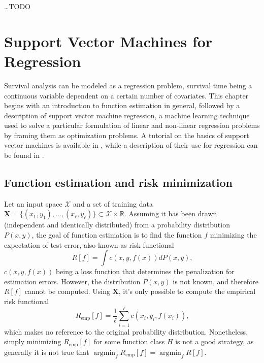 \documentclass[12pt]{report}
\begin{document}
\ldots TODO


\chapter{Support Vector Machines for Regression}
\label{chsvm}
Survival analysis can be modeled as a regression problem, survival time being a continuous variable dependent on a certain number of covariates. This chapter begins with an introduction to function estimation in general, followed by a description of support vector machine regression, a machine learning technique used to solve a particular formulation of linear and non-linear regression problems by framing them as optimization problems. A tutorial on the basics of support vector machines is available in \cite{svmtutorial}, while a description of their use for regression can be found in \cite{svregtutorial}.

\section{Function estimation and risk minimization}
Let an input space $ \mathcal{X} $ and a set of training data $ \mathbf{X} = \lbrace (x_{1},y_{1}),\ldots,(x_{\ell},y_{\ell})\rbrace \subset \mathcal{X} \times \mathbb{R} $. Assuming it has been drawn (independent and identically distributed) from a probability distribution $ P(x,y) $, the goal of function estimation is to find the function $ f $ minimizing the expectation of test error, also known as risk functional \cite{vapnik82}
\begin{equation} \label{riskfun}
R[f] = \int c(x,y,f(x))dP(x,y) \text{,}
\end{equation}
$ c(x,y,f(x)) $ being a loss function that determines the penalization for estimation errors. However, the distribution $ P(x,y) $ is not known, and therefore $ R[f] $ cannot be computed. Using $ \mathbf{X} $, it's only possible to compute the empirical risk functional
\begin{equation} \label{empriskfun}
R_{\text{emp}}[f] = \dfrac{1}{\ell} \sum_{i=1}^{\ell}c(x_{i},y_{i},f(x_{i})) \text{,}
\end{equation}
which makes no reference to the original probability distribution. Nonetheless, simply minimizing $ R_{\text{emp}}[f] $ for some function class $ H $ is not a good strategy, as generally it is not true that $ \operatorname*{argmin}_{f} R_{\text{emp}}[f] = \operatorname*{argmin}_{f} R[f] $.
\end{document}
